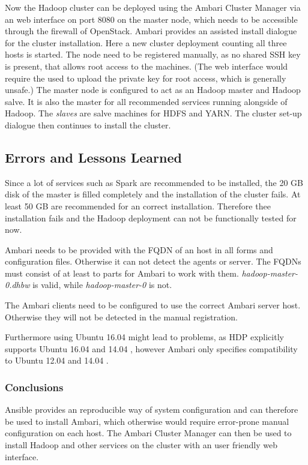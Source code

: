 Now the Hadoop cluster can be deployed using the Ambari Cluster Manager 
via an web interface on port 8080 on the master node, 
which needs to be accessible through the firewall of OpenStack.
Ambari provides an assisted install dialogue for the cluster installation. 
Here a new cluster deployment counting all three hosts is started.
The node need to be registered manually, as no shared \ac{SSH} key is present, that allows root access to the machines. 
(The web interface would require the used to upload the private key for root access, which is generally unsafe.)
The master node is configured to act as an Hadoop master and Hadoop salve. 
It is also the master for all recommended services running alongside of Hadoop.
The \emph{slaves} are salve machines for \ac{HDFS} and \ac{YARN}.
The cluster set-up dialogue then continues to install the cluster.


\subsection{Errors and Lessons Learned}
\label{sec:ambari:errors}
Since a lot of services such as Spark are recommended to be installed, 
the 20 \ac{GB} disk of the master is filled completely and the installation of the cluster fails. At least 50 \ac{GB} are recommended for an correct installation.
Therefore thee installation fails and the Hadoop deployment can not be functionally tested for now.

Ambari needs to be provided with the \ac{FQDN} of an host 
in all forms and configuration files. 
Otherwise it can not detect the agents or server.
The \acp{FQDN} must consist of at least to parts for Ambari to work with them. 
\emph{hadoop-master-0.dhbw} is valid, while \emph{hadoop-master-0} is not.

The Ambari clients need to be configured 
to use the correct Ambari server host.
Otherwise they will not be detected in the manual registration.

Furthermore using Ubuntu 16.04 might lead to problems, as \ac{HDP} explicitly supports Ubuntu 16.04 and 14.04 \autocite[][]{hortonworks2018requirements}, however Ambari only specifies compatibility to Ubuntu 12.04 and 14.04 \autocite[][]{ambari2018ambari}.


\subsubsection{Conclusions}
Ansible provides an reproducible way of system configuration 
and can therefore be used to install Ambari, 
which otherwise would require error-prone manual configuration on each host.
The Ambari Cluster Manager can then be used to install Hadoop and other services on the cluster with an user friendly web interface.


